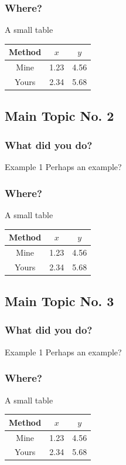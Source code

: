 \documentclass[t,10pt]{beamer}
\begin{document}
\begin{frame}
  \frametitle{Where?}
  \begin{block}{A small table}
  \begin{center}
  \begin{tabular}{ccc}
  \toprule
  Method & $x$ & $y$ \\
  \midrule
  Mine  & 1.23 & 4.56 \\
  Yours & 2.34 & 5.68 \\
  \bottomrule
  \end{tabular}
  \end{center}
  \end{block}
\end{frame}

\subsection{Main Topic No. 2}
\begin{frame}
  \frametitle{What did you do?}
  \begin{exampleblock}{Example 1}
  Perhaps an example?
  \end{exampleblock}
\end{frame}

\begin{frame}
  \frametitle{Where?}
  \begin{block}{A small table}
  \begin{center}
  \begin{tabular}{ccc}
  \toprule
  Method & $x$ & $y$ \\
  \midrule
  Mine  & 1.23 & 4.56 \\
  Yours & 2.34 & 5.68 \\
  \bottomrule
  \end{tabular}
  \end{center}
  \end{block}
\end{frame}

\subsection{Main Topic No. 3}
\begin{frame}
  \frametitle{What did you do?}
  \begin{exampleblock}{Example 1}
  Perhaps an example?
  \end{exampleblock}
\end{frame}

\begin{frame}
  \frametitle{Where?}
  \begin{block}{A small table}
  \begin{center}
  \begin{tabular}{ccc}
  \toprule
  Method & $x$ & $y$ \\
  \midrule
  Mine  & 1.23 & 4.56 \\
  Yours & 2.34 & 5.68 \\
  \bottomrule
  \end{tabular}
  \end{center}
  \end{block}
\end{frame}
\end{document}
